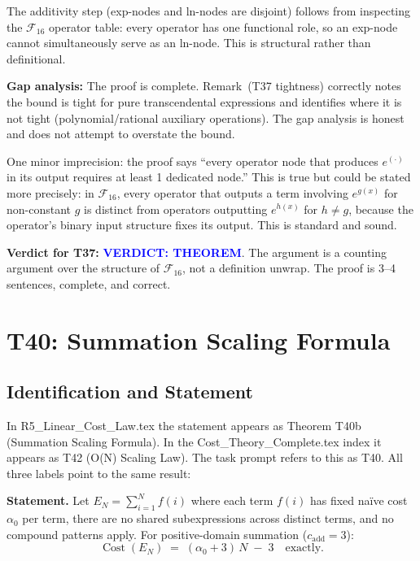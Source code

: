 \documentclass[12pt,a4paper]{article}
\theoremstyle{definition}
\newcommand{\Cost}{\operatorname{Cost}}
\newcommand{\Fam}{\mathcal{F}}
\newcommand{\verdictTHEOREM}{\textbf{\textcolor{blue}{VERDICT: THEOREM}}}
\begin{document}
The additivity step (exp-nodes and ln-nodes are disjoint) follows from
inspecting the $\Fam_{16}$ operator table: every operator has one functional
role, so an exp-node cannot simultaneously serve as an ln-node.  This is
structural rather than definitional.

\textbf{Gap analysis:}  The proof is complete.  Remark~(T37 tightness) correctly
notes the bound is tight for pure transcendental expressions and identifies
where it is not tight (polynomial/rational auxiliary operations).  The gap
analysis is honest and does not attempt to overstate the bound.

One minor imprecision: the proof says ``every operator node that produces
$e^{(\cdot)}$ in its output requires at least 1 dedicated node.''  This is
true but could be stated more precisely: in $\Fam_{16}$, every operator that
outputs a term involving $e^{g(x)}$ for non-constant $g$ is distinct from
operators outputting $e^{h(x)}$ for $h \neq g$, because the operator's binary
input structure fixes its output.  This is standard and sound.

\textbf{Verdict for T37:}  \verdictTHEOREM.
The argument is a counting argument over the structure of $\Fam_{16}$, not a
definition unwrap.  The proof is 3--4 sentences, complete, and correct.

\section{T40: Summation Scaling Formula}

\subsection{Identification and Statement}

In R5\_Linear\_Cost\_Law.tex the statement appears as Theorem T40b
(Summation Scaling Formula).  In the Cost\_Theory\_Complete.tex index it
appears as T42 (O(N) Scaling Law).  The task prompt refers to this as T40.
All three labels point to the same result:

\medskip
\noindent\textbf{Statement.}  Let $E_N = \sum_{i=1}^{N} f(i)$ where each
term $f(i)$ has fixed na\"{i}ve cost $\alpha_0$ per term, there are no shared
subexpressions across distinct terms, and no compound patterns apply.
For positive-domain summation ($c_{\mathrm{add}} = 3$):
\[
  \Cost(E_N) \;=\; (\alpha_0 + 3)\,N \;-\; 3 \quad \text{exactly}.
\]
\end{document}
